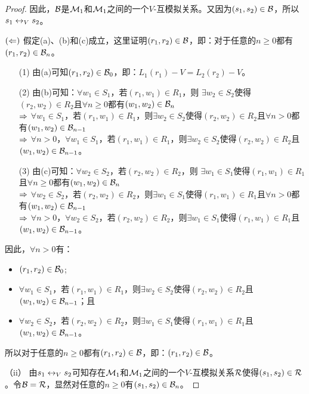 \begin{proof}
因此，${\cal B}$是${\cal M}_1$和${\cal M}_1$之间的一个$V$-互模拟关系。又因为$(s_1, s_2)\in {\cal B}$，所以$s_1 \leftrightarrow_V s_2$。

$(\Leftarrow)$ 假定(a)、(b)和(c)成立，这里证明$(r_1, r_2)\in {\cal B}$，即：对于任意的$n\geq 0$都有$(r_1, r_2)\in {\cal B}_n$。

\begin{itemize}
	\item[(1)]  由(a)可知$(r_1, r_2) \in {\cal B}_0$，即：$L_1(r_1)-V = L_2(r_2)-V$。
	\item[(2)] 由(b)可知：$\forall w_1 \in S_1$，若$(r_1, w_1)\in R_1$，则 $\exists w_2 \in S_2$使得$(r_2,w_2) \in R_2$且$\forall n\geq 0$都有$(w_1, w_2) \in {\cal B}_n$ \\ 
	$\Rightarrow$ $\forall w_1 \in S_1$，若$(r_1, w_1)\in R_1$，则$\exists w_2 \in S_2$使得$(r_2,w_2) \in R_2$且$\forall n > 0$都有$(w_1, w_2) \in {\cal B}_{n-1}$\\
	$\Rightarrow$ $\forall n > 0$，$\forall w_1 \in S_1$，若$(r_1, w_1)\in R_1$，则$\exists w_2 \in S_2$使得$(r_2,w_2) \in R_2$且$(w_1, w_2) \in {\cal B}_{n-1}$。
	\item[(3)] 由(c)可知：$\forall w_2\in S_2$，若$(r_2, w_2)\in R_2$，则 $\exists w_1 \in S_1$使得$(r_1,w_1) \in R_1$且$\forall n\geq 0$都有$(w_1, w_2)\in {\cal B}_n$\\
	$\Rightarrow$ $\forall w_2\in S_2$，若$(r_2, w_2)\in R_2$，则$\exists w_1 \in S_1$使得$(r_1,w_1) \in R_1$且$\forall n > 0$都有$(w_1, w_2)\in {\cal B}_{n-1}$\\
	$\Rightarrow$ $\forall n > 0$，$\forall w_2\in S_2$，若$(r_2, w_2)\in R_2$，则$\exists w_1 \in S_1$使得$(r_1,w_1) \in R_1$且$(w_1, w_2)\in {\cal B}_{n-1}$。
\end{itemize}

因此，$\forall n > 0$有：
\begin{itemize}
	\item $(r_1, r_2) \in {\cal B}_0$;
	\item $\forall w_1 \in S_1$，若$(r_1, w_1)\in R_1$，则$\exists w_2 \in S_2$使得$(r_2,w_2) \in R_2$且$(w_1, w_2) \in {\cal B}_{n-1}$；且
	\item $\forall w_2\in S_2$，若$(r_2, w_2)\in R_2$，则$\exists w_1 \in S_1$使得$(r_1,w_1) \in R_1$且$(w_1, w_2)\in {\cal B}_{n-1}$。
\end{itemize}
	
所以对于任意的$n\geq 0$都有$(r_1, r_2)\in {\cal B}$，即：$(r_1, r_2)\in {\cal B}$。

（ii） 由$s_1 \leftrightarrow_V s_2$可知存在${\cal M}_1$和${\cal M}_1$之间的一个$V$-互模拟关系${\cal R}$使得$(s_1, s_2)\in {\cal R}$。令${\cal B}={\cal R}$，显然对任意的$n\geq 0$有$(s_1,s_2)\in {\cal B}_n$。
	
\end{proof}

